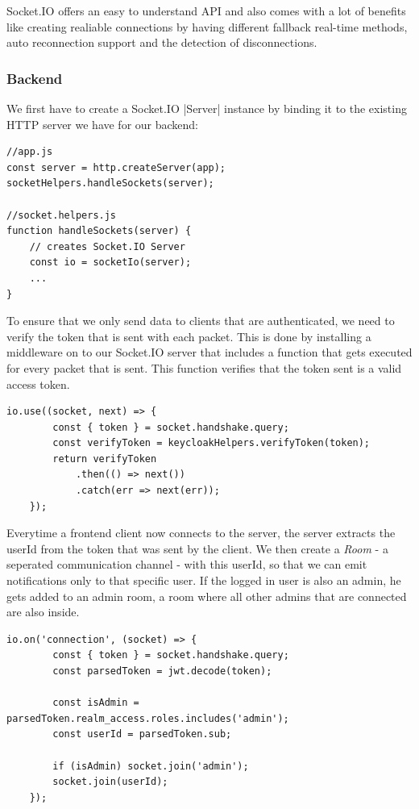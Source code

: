 Socket.IO offers an easy to understand API and also comes with a lot of benefits like creating realiable connections by having different fallback real-time methods, auto reconnection support and the detection of disconnections.

\subsubsection{Backend}
\label{Backend}

We first have to create a Socket.IO |Server|\cite{socketio:server} instance by binding it to the existing HTTP server we have for our backend:

\begin{lstlisting}[label=createSocketIOServer]
//app.js
const server = http.createServer(app);
socketHelpers.handleSockets(server);

//socket.helpers.js
function handleSockets(server) {
	// creates Socket.IO Server
    const io = socketIo(server);
    ...
}
\end{lstlisting}

To ensure that we only send data to clients that are authenticated, we need to verify the token that is sent with each packet. This is done by installing a middleware on to our Socket.IO server that includes a function that gets executed for every packet that is sent. This function verifies that the token sent is a valid access token.

\begin{lstlisting}[label=createSocketIOMiddleware]
    io.use((socket, next) => {
        const { token } = socket.handshake.query;
        const verifyToken = keycloakHelpers.verifyToken(token);
        return verifyToken
            .then(() => next())
            .catch(err => next(err));
    });
\end{lstlisting}

Everytime a frontend client now connects to the server, the server extracts the userId from the token that was sent by the client. We then create a \emph{Room}\cite{socketio:rooms} - a seperated communication channel - with this userId, so that we can emit notifications only to that specific user. If the logged in user is also an admin, he gets added to an admin room, a room where all other admins that are connected are also inside.

\begin{lstlisting}[label=onConnection]
io.on('connection', (socket) => {
        const { token } = socket.handshake.query;
        const parsedToken = jwt.decode(token);

        const isAdmin = parsedToken.realm_access.roles.includes('admin');
        const userId = parsedToken.sub;

        if (isAdmin) socket.join('admin');
        socket.join(userId);
    });
\end{lstlisting}

